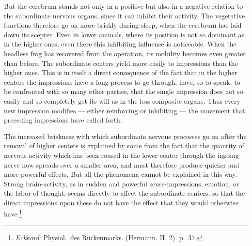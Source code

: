 \documentclass[12pt,a4paper]{book}
\newcommand{\opage}[1]{\marginnote{\footnotesize\textit{[#1]}}}
\begin{document}
But the cerebrum stands not only in a positive but also in a negative
relation to the subordinate nervous organs, since it can inhibit their
activity. The vegetative functions therefore go on more briskly during
sleep, when the cerebrum has laid down its scepter. Even in lower
animals, where its position is not so dominant as in the higher ones,
even there this inhibiting influence is noticeable. When the headless
frog has recovered from the operation, its mobility becomes even greater
than before. The subordinate centers yield more easily to impressions
than the higher ones. This is in itself a direct consequence of the fact
that in the higher centers the impressions have a long process to go
through, have, so to speak, to be confronted with so many other parties,
that the single impression does not so easily and so completely get its
will as in the less composite organs. Thus every new impression modifies
--- either reinforcing or inhibiting --- the movement that preceding
impressions have called forth.

The increased briskness with which subordinate nervous processes go on
after the removal of higher centers is explained by some from the fact
that the quantity of nervous activity which has been roused in the lower
center through the ingoing nerve now spreads over a smaller area, and
must therefore produce quicker and more powerful effects. But all the
phenomena cannot be explained in this way. Strong
\opage{53}brain-activity, as in sudden and powerful sense-impressions,
emotion, or the labor of thought, seems directly to affect the
subordinate centers, so that the direct impressions upon these do not
have the effect that they
would otherwise have.\footnote{\emph{Eckhard}: Physiol.\ des
Rückenmarks. (Hermann. II, 2). p.~37.}
\end{document}
